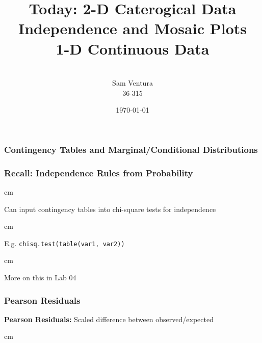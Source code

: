 \documentclass{beamer} %
\begin{document}
\title[dedup]{Today:  2-D Caterogical Data \\ Independence and Mosaic Plots \\ 1-D Continuous Data}


\author[Samuel L. Ventura]{\\
  \large{Sam Ventura\\36-315}}
\date{\today}


\begin{frame}
	\maketitle
	
\end{frame}




\begin{frame}\frametitle{Contingency Tables and Marginal/Conditional Distributions}
	\small
	
	
	
\end{frame}



\begin{frame}\frametitle{Recall:  Independence Rules from Probability}
	\small
	
	 cm
	
	Can input contingency tables into chi-square tests for independence
	
	 cm
	
	E.g. \texttt{chisq.test(table(var1, var2))}
	
	 cm
	
	More on this in Lab 04
	
\end{frame}


\begin{frame}\frametitle{Pearson Residuals}
	\small
	
	\textbf{Pearson Residuals:}  Scaled difference between observed/expected%
	
	
	 cm
	
\end{frame}
\end{document}
